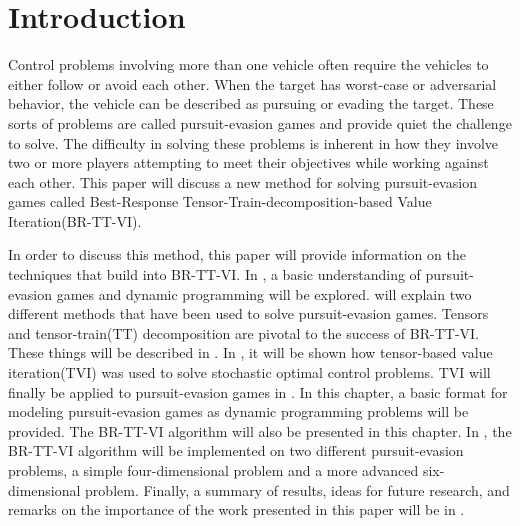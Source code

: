 \chapter{Introduction}\label{chp:intro} 
Control problems involving more than one vehicle often require the vehicles to either follow or avoid each other. When the target has worst-case or adversarial behavior, the vehicle can be described as pursuing or evading the target. These sorts of problems are called pursuit-evasion games and provide quiet the challenge to solve. The difficulty in solving these problems is inherent in how they involve two or more players attempting to meet their objectives while working against each other. This paper will discuss a new method for solving pursuit-evasion games called Best-Response Tensor-Train-decomposition-based Value Iteration(BR-TT-VI). 

In order to discuss this method, this paper will provide information on the techniques that build into BR-TT-VI. In , a basic understanding of pursuit-evasion games and dynamic programming will be explored.  will explain two different methods that have been used to solve pursuit-evasion games. Tensors and tensor-train(TT) decomposition are pivotal to the success of BR-TT-VI. These things will be described in . In , it will be shown how tensor-based value iteration(TVI) was used to solve stochastic optimal control problems. TVI will finally be applied to pursuit-evasion games in . In this chapter, a basic format for modeling pursuit-evasion games as dynamic programming problems will be provided. The BR-TT-VI algorithm will also be presented in this chapter. In , the BR-TT-VI algorithm will be implemented on two different pursuit-evasion problems, a simple four-dimensional problem and a more advanced six-dimensional problem. Finally, a summary of results, ideas for future research, and remarks on the importance of the work presented in this paper will be in .
    

